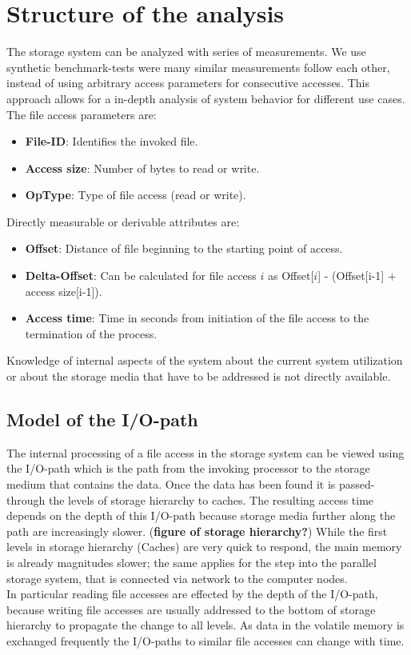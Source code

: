 \documentclass{superfri}
\begin{document}
\section{Structure of the analysis}
The storage system can be analyzed with series of measurements.
We use synthetic benchmark-tests were many similar measurements follow each other, instead of using arbitrary access parameters for consecutive accesses.
This approach allows for a in-depth analysis of system behavior for different use cases.\\
The file access parameters are:
\begin{itemize}
	\item \textbf{File-ID}: Identifies the invoked file.
	\item \textbf{Access size}: Number of bytes to read or write.
	\item \textbf{OpType}: Type of file access (read or write).
\end{itemize}
Directly measurable or derivable attributes are:
\begin{itemize}
	\item \textbf{Offset}: Distance of file beginning to the starting point of access.
	\item \textbf{Delta-Offset}: Can be calculated for file access $i$ as Offset[$i$] - (Offset[i-1] + access size[i-1]).
	\item \textbf{Access time}: Time in seconds from initiation of the file access to the termination of the process.
\end{itemize}
Knowledge of internal aspects of the system about the current system utilization or about the storage media that have to be addressed is not directly available.

\subsection{Model of the I/O-path}
The internal processing of a file access in the storage system can be viewed using the I/O-path which is the path from the invoking processor to the storage medium that contains the data. Once the data has been found it is passed-through the levels of storage hierarchy to caches.
The resulting access time depends on the depth of this I/O-path because storage media further along the path are increasingly slower.
(\textbf{figure of storage hierarchy?})
While the first levels in storage hierarchy (Caches) are very quick to respond, the main memory is already magnitudes slower; the same applies for the step into the parallel storage system, that is connected via network to the computer nodes.\\
In particular reading file accesses are effected by the depth of the I/O-path, because writing file accesses are usually addressed to the bottom of storage hierarchy to propagate the change to all levels.
As data in the volatile memory is exchanged frequently the I/O-paths to similar file accesses can change with time.
\end{document}
